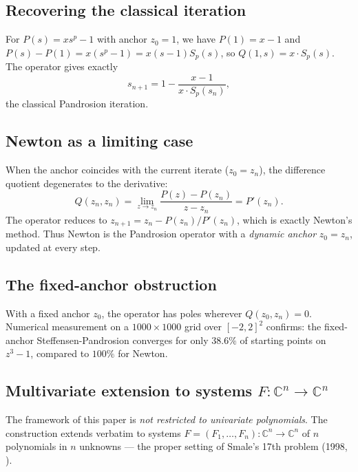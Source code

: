 \documentclass[11pt,a4paper]{article}
\begin{document}
\subsection{Recovering the classical iteration}

For $P(s) = xs^p - 1$ with anchor $z_0 = 1$, we have $P(1) = x - 1$ and $P(s) - P(1) = x(s^p - 1) = x(s - 1) S_p(s)$, so $Q(1, s) = x \cdot S_p(s)$. The operator gives exactly
$$ s_{n+1} = 1 - \frac{x - 1}{x \cdot S_p(s_n)}, $$
the classical Pandrosion iteration.

\subsection{Newton as a limiting case}

When the anchor coincides with the current iterate ($z_0 = z_n$), the difference quotient degenerates to the derivative:
$$ Q(z_n, z_n) = \lim_{z \to z_n} \frac{P(z) - P(z_n)}{z - z_n} = P'(z_n). $$
The operator reduces to $z_{n+1} = z_n - P(z_n)/P'(z_n)$, which is exactly Newton's method. Thus Newton is the Pandrosion operator with a \emph{dynamic anchor} $z_0 = z_n$, updated at every step.

\subsection{The fixed-anchor obstruction}

With a fixed anchor $z_0$, the operator has poles wherever $Q(z_0, z_n) = 0$. Numerical measurement on a $1000 \times 1000$ grid over $[-2, 2]^2$ confirms: the fixed-anchor Steffensen-Pandrosion converges for only $38.6\%$ of starting points on $z^3 - 1$, compared to $100\%$ for Newton.

\subsection{Multivariate extension to systems $F : \mathbb{C}^n \to \mathbb{C}^n$}\label{sec:multivariate}

The framework of this paper is \emph{not restricted to univariate polynomials}. The construction extends verbatim to systems $F = (F_1, \dots, F_n) : \mathbb{C}^n \to \mathbb{C}^n$ of $n$ polynomials in $n$ unknowns --- the proper setting of Smale's 17th problem (1998, \cite{smale1998, beltranpardo, lairez}).
\end{document}
